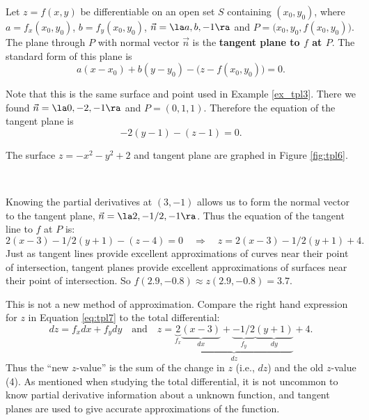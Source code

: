 {Let $z=f(x,y)$ be differentiable on an open set $S$ containing $(x_0,y_0)$, where
$a = f_x(x_0,y_0)$, $b=f_y(x_0,y_0)$, $\vec n= \la a,b,-1\ra$ and $P=\big(x_0,y_0,f(x_0,y_0)\big)$.\\

The plane through $P$ with normal vector $\vec n$ is the \textbf{tangent plane to $f$ at $P$}. The standard form of this plane is 
\[
a(x-x_0) + b(y-y_0) - \big(z-f(x_0,y_0)\big) = 0.
\]
}
\pagebreak

{Note that this is the same surface and point used in Example \ref{ex_tpl3}. There we found $\vec n = \la 0,-2,-1\ra$ and $P = (0,1,1)$. Therefore the equation of the tangent plane is 
\[
-2(y-1)-(z-1)=0.
\]

The surface $z=-x^2-y^2+2$ and tangent plane are graphed in Figure \ref{fig:tpl6}. 
}\\

{Knowing the partial derivatives at $(3,-1)$ allows us to form the normal vector to the tangent plane, $\vec n = \la 2,-1/2,-1\ra$. Thus the equation of the tangent line to $f$ at $P$ is:
\begin{equation}
2(x-3)-1/2(y+1) - (z-4) = 0 \quad \Rightarrow \quad z = 2(x-3)-1/2(y+1)+4.\label{eq:tpl7}\end{equation}
Just as tangent lines provide excellent approximations of curves near their point of intersection, tangent planes provide excellent approximations of surfaces near their point of intersection. So $f(2.9,-0.8) \approx z(2.9,-0.8) = 3.7.$

This is not a new method of approximation. Compare the right hand expression for $z$ in Equation \eqref{eq:tpl7} to the total differential:
\[
dz = f_xdx + f_ydy \quad \text{and} \quad z = \underbrace{\underbrace{2}_{f_x}\underbrace{(x-3)}_{dx}+\underbrace{-1/2}_{f_y}\underbrace{(y+1)}_{dy}}_{dz}+4.
\]
Thus the ``new $z$-value'' is the sum of the change in $z$ (i.e., $dz$) and the old $z$-value (4). As mentioned when studying the total differential, it is not uncommon to know partial derivative information about a unknown function, and tangent planes are used to give accurate approximations of the function.
}\\

